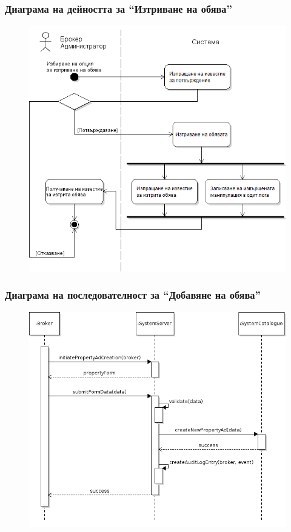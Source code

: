 \documentclass[12pt]{beamer}
\begin{document}
\begin{frame}[fragile]
\frametitle{Диаграма на дейността за ``Изтриване на обява''}
        \begin{figure}[h]
        \centering
		\includegraphics[scale=0.35,keepaspectratio=true]{uml08}
        \end{figure}
\end{frame}

\begin{frame}[fragile]
\frametitle{Диаграма на последователност за ``Добавяне на обява''}
        \begin{figure}[h]
        \centering
		\includegraphics[scale=0.35,keepaspectratio=true]{uml09}
        \end{figure}
\end{frame}
\end{document}
